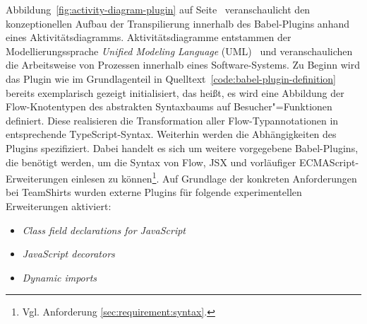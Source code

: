 Abbildung~\ref{fig:activity-diagram-plugin} auf Seite~\pageref{fig:activity-diagram-plugin} veranschaulicht den konzeptionellen Aufbau der Transpilierung innerhalb des Babel-Plugins anhand eines Aktivitätsdiagramms. Aktivitätsdiagramme entstammen der Modellierungssprache \textit{Unified Modeling Language} (UML)~\autocite{OMG:UML} und veranschaulichen die Arbeitsweise von Prozessen innerhalb eines Software-Systems. Zu Beginn wird das Plugin wie im Grundlagenteil in Quelltext~\ref{code:babel-plugin-definition} bereits exemplarisch gezeigt initialisiert, das heißt, es wird eine Abbildung der Flow-Knotentypen des abstrakten Syntaxbaums auf Besucher"=Funktionen definiert. Diese realisieren die Transformation aller Flow-Typannotationen in entsprechende TypeScript-Syntax.
Weiterhin werden die Abhängigkeiten des Plugins spezifiziert. Dabei handelt es sich um weitere vorgegebene Babel-Plugins, die benötigt werden, um die Syntax von Flow, JSX und vorläufiger ECMAScript-Erweiterungen einlesen zu können\footnote{Vgl. Anforderung \ref{sec:requirement:syntax}.}. Auf Grundlage der konkreten Anforderungen bei TeamShirts wurden externe Plugins für folgende experimentellen Erweiterungen aktiviert:

\begin{itemize}
  \item \textit{Class field declarations for JavaScript}~\autocite{ES_PROPOSAL:CLASS_FIELDS}
  \item \textit{JavaScript decorators}~\autocite{ES_PROPOSAL:DECORATORS}
  \item \textit{Dynamic imports}~\autocite{ES_PROPOSAL:DYNAMIC_IMPORTS}
\end{itemize}

